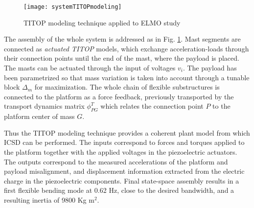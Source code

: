 \documentclass{ifacconf}
\begin{document}
\begin{figure} 
\centering
\texttt{[image: systemTITOPmodeling]}
\caption{TITOP modeling technique applied to ELMO study}
\label{fig:elmoTITOP}
\end{figure}

The assembly of the whole system is addressed as in Fig. \ref{fig:elmoTITOP}. Mast segments are connected as \textit{actuated TITOP} models, which exchange acceleration-loads through their connection points until the end of the mast, where the payload is placed. The masts can be actuated through the input of voltages $v_i$. The payload has been parametrized so that mass variation is taken into account through a tunable block $\Delta_m$ for maximization. The whole chain of flexible substructures is connected to the platform as a force feedback, previously transported by the transport dynamics matrix $\phi^T_{PG}$ which relates the connection point $P$ to the platform center of mass $G$.

Thus the TITOP modeling technique provides a coherent plant model from which ICSD can be performed. The inputs correspond to forces and torques applied to the platform together with the applied voltages in the piezoelectric actuators. The outputs correspond to the measured accelerations of the platform and payload misalignment, and displacement information extracted from the electric charge in the piezoelectric components. Final state-space assembly results in a first flexible bending mode at 0.62 Hz, close to the desired bandwidth, and a resulting inertia of 9800 Kg m$^2$.
\end{document}
